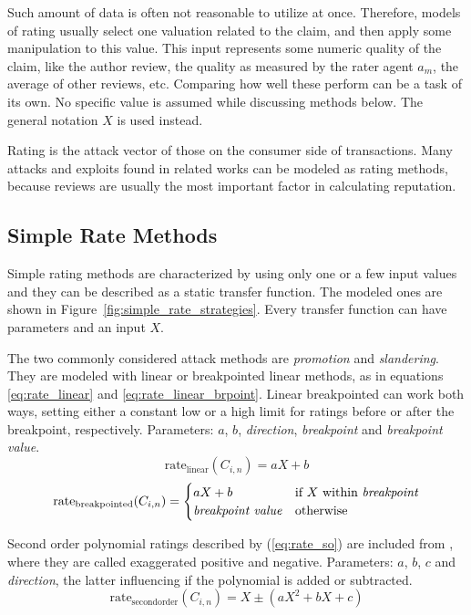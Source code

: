 \documentclass[%
    ]{\PathToTumTemplate/thesis/tum_thesis}
\begin{document}
Such amount of data is often not reasonable to utilize at once.
Therefore, models of rating usually select one valuation related to the claim, and then apply some manipulation to this value.
This input represents some numeric quality of the claim, like the author review, the quality as measured by the rater agent $a_m$, the average of other reviews, etc.
Comparing how well these perform can be a task of its own.
No specific value is assumed while discussing methods below.
The general notation $X$ is used instead.

Rating is the attack vector of those on the consumer side of transactions.
Many attacks and exploits found in related works can be modeled as rating methods, because reviews are usually the most important factor in calculating reputation.


\subsection{Simple Rate Methods}

Simple rating methods are characterized by using only one or a few input values and they can be described as a static transfer function.
The modeled ones are shown in Figure~\ref{fig:simple_rate_strategies}.
Every transfer function can have parameters and an input $X$.

The two commonly considered attack methods are \emph{promotion} and \emph{slandering}\cite{hoffman_survey_2009}.
They are modeled with linear or breakpointed linear methods, as in equations \ref{eq:rate_linear} and \ref{eq:rate_linear_brpoint}.
Linear breakpointed can work both ways, setting either a constant low or a high limit for ratings before or after the breakpoint, respectively.
Parameters: $a$, $b$, \emph{direction}, \emph{breakpoint} and \emph{breakpoint value}.
\begin{equation}\label{eq:rate_linear}
\mathrm{rate_{linear}}(C_{i,n}) = aX+b
\end{equation}
\begin{equation}\label{eq:rate_linear_brpoint}
\mathrm{rate_{breakpointed}}(C_{i,n}) = 
    \begin{cases}
      aX+b & \text{if $X$ within \emph{breakpoint}} \\
      \text{\emph{breakpoint value}} & \text{otherwise}\\
    \end{cases}
\end{equation}

Second order polynomial ratings described by (\ref{eq:rate_so}) are included from \cite{yu_detecting_2003}, where they are called exaggerated positive and negative.
Parameters: $a$, $b$, $c$ and \emph{direction}, the latter influencing if the polynomial is added or subtracted.
\begin{equation}\label{eq:rate_so}
\mathrm{rate_{second order}}(C_{i,n}) = X \pm (aX^2+bX+c)
\end{equation}
\end{document}
